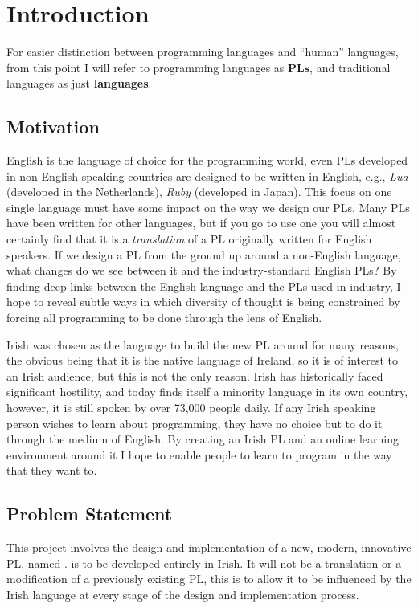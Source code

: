 \chapter{Introduction}
For easier distinction between programming languages and ``human'' languages, from this point I will refer to programming languages as \textbf{PLs}, and traditional languages as just \textbf{languages}.

\section{Motivation}
English is the language of choice for the programming world, even PLs developed in non-English speaking countries are designed to be written in English, e.g., \emph{Lua} (developed in the Netherlands), \emph{Ruby} (developed in Japan).
This focus on one single language must have some impact on the way we design our PLs.
Many PLs have been written for other languages, but if you go to use one you will almost certainly find that it is a \emph{translation} of a PL originally written for English speakers\cite{wikipllist}.
If we design a PL from the ground up around a non-English language, what changes do we see between it and the industry-standard English PLs? By finding deep links between the English language and the PLs used in industry, I hope to reveal subtle ways in which diversity of thought is being constrained by forcing all programming to be done through the lens of English.

Irish was chosen as the language to build the new PL around for many reasons, the obvious being that it is the native language of Ireland, so it is of interest to an Irish audience, but this is not the only reason.
Irish has historically faced significant hostility, and today finds itself a minority language in its own country, however, it is still spoken by over 73,000 people daily\cite{csoirish}.
If any Irish speaking person wishes to learn about programming, they have no choice but to do it through the medium of English.
By creating an Irish PL and an online learning environment around it I hope to enable people to learn to program in the way that they want to.

\section{Problem Statement}
This project involves the design and implementation of a new, modern, innovative PL, named \Setanta{}.
\Setanta{} is to be developed entirely in Irish.
It will not be a translation or a modification of a previously existing PL, this is to allow it to be influenced by the Irish language at every stage of the design and implementation process.


